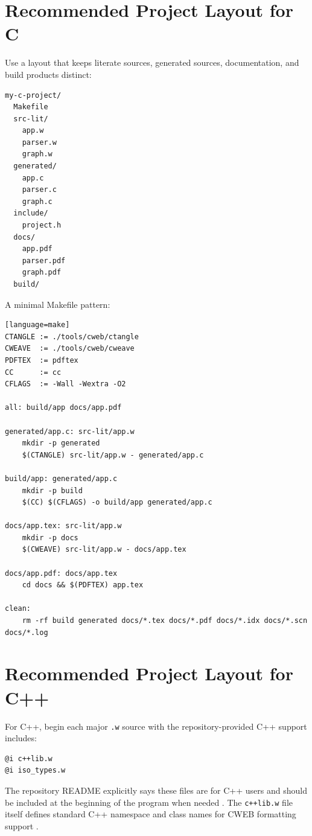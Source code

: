 \documentclass[11pt]{article}
\begin{document}
\section{Recommended Project Layout for C}

Use a layout that keeps literate sources, generated sources, documentation, and build products distinct:

\begin{verbatim}
my-c-project/
  Makefile
  src-lit/
    app.w
    parser.w
    graph.w
  generated/
    app.c
    parser.c
    graph.c
  include/
    project.h
  docs/
    app.pdf
    parser.pdf
    graph.pdf
  build/
\end{verbatim}

A minimal Makefile pattern:

\begin{verbatim}[language=make]
CTANGLE := ./tools/cweb/ctangle
CWEAVE  := ./tools/cweb/cweave
PDFTEX  := pdftex
CC      := cc
CFLAGS  := -Wall -Wextra -O2

all: build/app docs/app.pdf

generated/app.c: src-lit/app.w
	mkdir -p generated
	$(CTANGLE) src-lit/app.w - generated/app.c

build/app: generated/app.c
	mkdir -p build
	$(CC) $(CFLAGS) -o build/app generated/app.c

docs/app.tex: src-lit/app.w
	mkdir -p docs
	$(CWEAVE) src-lit/app.w - docs/app.tex

docs/app.pdf: docs/app.tex
	cd docs && $(PDFTEX) app.tex

clean:
	rm -rf build generated docs/*.tex docs/*.pdf docs/*.idx docs/*.scn docs/*.log
\end{verbatim}

\section{Recommended Project Layout for C++}

For C++, begin each major \texttt{.w} source with the repository-provided C++ support includes:

\begin{verbatim}
@i c++lib.w
@i iso_types.w
\end{verbatim}

The repository README explicitly says these files are for C++ users and should be included at the beginning of the program when needed \cite{repo-readme}. The \texttt{c++lib.w} file itself defines standard C++ namespace and class names for CWEB formatting support \cite{repo-cpplib}.
\end{document}
